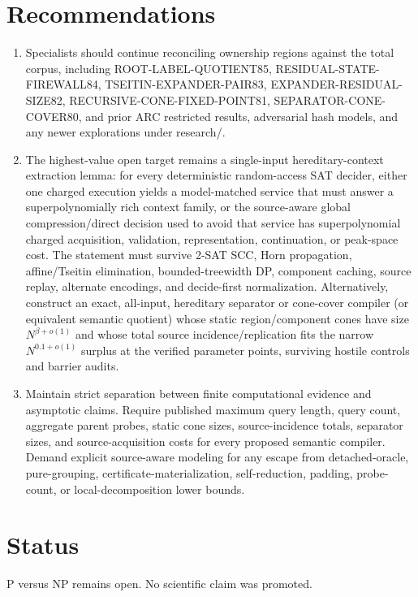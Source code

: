 \documentclass[11pt]{article}
\begin{document}
\section{Recommendations}
\begin{enumerate}
\item Specialists should continue reconciling ownership regions against the total corpus, including ROOT-LABEL-QUOTIENT85, RESIDUAL-STATE-FIREWALL84, TSEITIN-EXPANDER-PAIR83, EXPANDER-RESIDUAL-SIZE82, RECURSIVE-CONE-FIXED-POINT81, SEPARATOR-CONE-COVER80, and prior ARC restricted results, adversarial hash models, and any newer explorations under research/.
\item The highest-value open target remains a single-input hereditary-context extraction lemma: for every deterministic random-access SAT decider, either one charged execution yields a model-matched service that must answer a superpolynomially rich context family, or the source-aware global compression/direct decision used to avoid that service has superpolynomial charged acquisition, validation, representation, continuation, or peak-space cost. The statement must survive 2-SAT SCC, Horn propagation, affine/Tseitin elimination, bounded-treewidth DP, component caching, source replay, alternate encodings, and decide-first normalization. Alternatively, construct an exact, all-input, hereditary separator or cone-cover compiler (or equivalent semantic quotient) whose static region/component cones have size $N^{\beta+o(1)}$ and whose total source incidence/replication fits the narrow $N^{0.1+o(1)}$ surplus at the verified parameter points, surviving hostile controls and barrier audits.
\item Maintain strict separation between finite computational evidence and asymptotic claims. Require published maximum query length, query count, aggregate parent probes, static cone sizes, source-incidence totals, separator sizes, and source-acquisition costs for every proposed semantic compiler. Demand explicit source-aware modeling for any escape from detached-oracle, pure-grouping, certificate-materialization, self-reduction, padding, probe-count, or local-decomposition lower bounds.
\end{enumerate}

\section{Status}
P versus NP remains open. No scientific claim was promoted.

\end{document}
